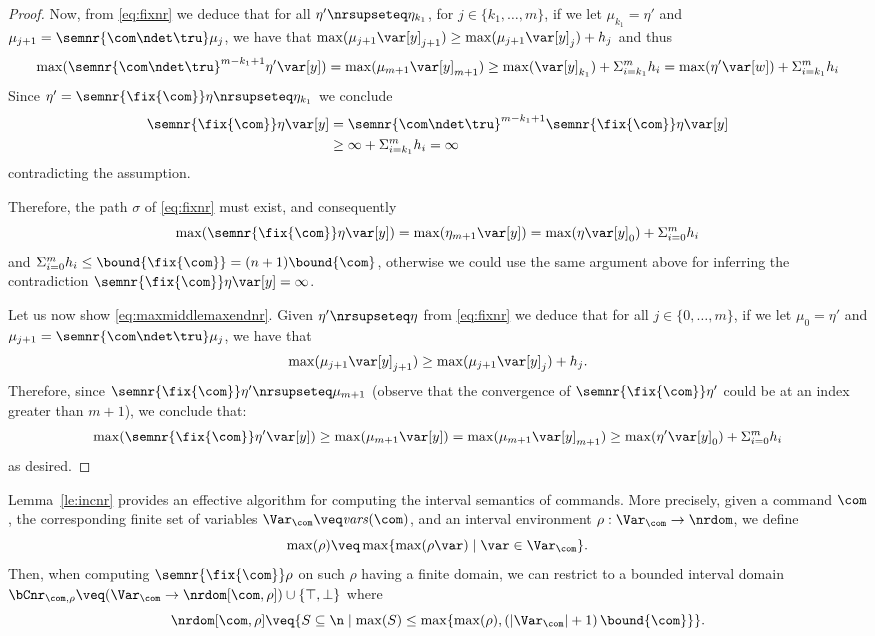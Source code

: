 \begin{proof}
  Now, from \eqref{eq:fixnr} we deduce that for all
  \(\eta' \nrsupseteq \eta_{k_1}\), for \(j \in \{ k_1, \ldots, m\}\),
  if we let \(\mu_{k_1} = \eta'\) and
  \(\mu_{j+1} = \semnr{\com \ndet \tru} \mu_j\), we have that
  \(\max(\mu_{j+1} \var[y]_{j+1}) \geq \max(\mu_{j+1} \var[y]_{j}) +
  h_j\) and thus
  \begin{equation*}
    \max(\semnr{\com \ndet \tru}^{m-k_1+1} \eta' \var[y]) = \max(\mu_{m+1}
    \var[y]_{m+1}) \geq 
    \max(\var[y]_{k_1}) + \Sigma_{i=k_1}^m h_i = \max(\eta' \var[w]) + \Sigma_{i=k_1}^m h_i
  \end{equation*}
  Since \(\eta' = \semnr{\fix{\com}} \eta \nrsupseteq \eta_{k_1}\) we conclude
  \begin{align*}
    \semnr{\fix{\com}} \eta \var[y]
    & = \semnr{\com \ndet \tru}^{m-k_1+1} \semnr{\fix{\com}} \eta \var[y]\\
    & \geq \infty + \Sigma_{i=k_1}^m h_i = \infty
  \end{align*}
  contradicting the assumption.
  
  \noindent
  Therefore, the path \(\sigma\) of \eqref{eq:fixnr} must exist, and
  consequently
  \[\max(\semnr{\fix{\com}} \eta \var[y]) = \max(\eta_{m+1} \var[y]) = \max(\eta  \var[y]_0) + \Sigma_{i=0}^m h_i\]
  and
  \(\Sigma_{i=0}^m h_i \leq \bound{\fix{\com}}=(n+1)\bound{\com}\),
  otherwise we could use the same argument above for inferring the
  contradiction \(\semnr{\fix{\com}} \eta \var[y] = \infty\).

  \medskip

  Let us now show \eqref{eq:maxmiddlemaxendnr}. Given
  \(\eta' \nrsupseteq \eta\) from \eqref{eq:fixnr} we deduce that for
  all \(j \in \{ 0, \ldots, m\}\), if we let \(\mu_0 = \eta'\) and
  \(\mu_{j+1} = \semnr{\com \ndet \tru} \mu_j\), we have that
  \[
  \max(\mu_{j+1} \var[y]_{j+1}) \geq \max(\mu_{j+1} \var[y]_{j}) + h_j.
  \]
  Therefore, since \(\semnr{\fix{\com}} \eta' \nrsupseteq \mu_{m+1}\)
  (observe that the convergence of \(\semnr{\fix{\com}} \eta' \) could
  be at an index greater than \(m+1\)), we conclude that:
  \[\max(\semnr{\fix{\com}} \eta' \var[y]) \geq \max(\mu_{m+1}
  \var[y]) = \max(\mu_{m+1} \var[y]_{m+1}) \geq \max(\eta' \var[y]_0)
  + \Sigma_{i=0}^m h_i\] as desired.
\end{proof}

Lemma~\ref{le:incnr} provides an effective algorithm for computing the
interval semantics of commands. More precisely, given a command
\(\com\), the corresponding finite set of variables
\(\Var_{\com} \veq \mathit{vars}(\com)\), and an interval environment
\(\rho : \Var_{\com} \to \nrdom\), we define
\[\max(\rho) \veq \max \{ \max(\rho\var) \mid \var \in \Var_{\com}
  \}.\]
%
Then, when computing \(\semnr{\fix{\com}} \rho\) on such \(\rho\)
having a finite domain, we can restrict to a bounded interval domain
\(\bCnr_{\com,\rho} \veq (\Var_{\com} \to \nrdom[\com,\rho]) \cup
\{ \top, \bot \}\) where
\[
  \nrdom[\com,\rho] \veq \{ S\subseteq \n \mid \max(S) \leq
  \max\{\max(\rho), \left(\left| \Var_{\com}\right| + 1 \right)
  \bound{\com}\}\}.
\]

